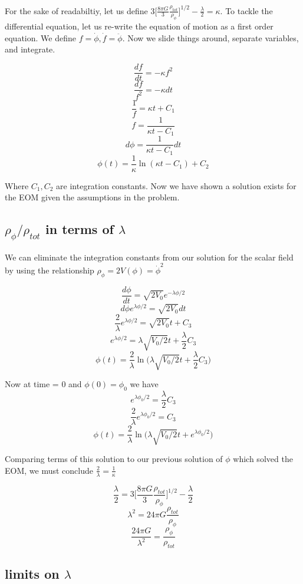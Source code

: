 \documentclass[12pt]{article}
\begin{document}
 For the sake of readabiltiy, let us define $3\Big[ \frac{8 \pi G}{3} \frac{\rho_{tot}}{ \rho_{\phi}} \Big]^{1/2} - \frac{\lambda}{2} = \kappa $. To tackle the differential equation, let us re-write the equation of motion as a first order equation. We define $f = \dot{\phi}, \dot{f} = \ddot{\phi}$. Now we slide things around, separate variables, and integrate. 
 
 $$\frac{d f}{d t} = -\kappa f^2 $$
 $$ \frac{df}{f^2} = -\kappa dt$$
 $$ \frac{1}{f} = \kappa t + C_1 $$
 $$ f = \frac{1}{\kappa t - C_1} $$
 $$ d\phi = \frac{1}{\kappa t - C_1} dt$$
 $$ \phi(t) = \frac{1}{\kappa} \ln(\kappa t - C_1) + C_2 $$
 
Where $C_1, C_2$ are integration constants. Now we have shown a solution exists for the EOM given the assumptions in the problem.

\subsection{$\rho_{\phi}/\rho_{tot}$ in terms of $\lambda$}

We can eliminate the integration constants from our solution for the scalar field by using the relationship $\rho_{\phi} = 2V(\phi) = \dot{\phi}^2$

$$ \frac{d\phi}{dt} = \sqrt{2V_0}e^{-\lambda \phi/2} $$
$$ d\phi e^{\lambda \phi/2}= \sqrt{2V_0} dt$$
$$  \frac{2}{\lambda} e^{\lambda \phi/2}= \sqrt{2V_0} t + C_3$$
$$ e^{\lambda \phi/2}= \lambda \sqrt{V_{0}/2} t + \frac{\lambda}{2}C_3$$
$$ \phi(t)= \frac{2}{\lambda} \ln  \Big(\lambda \sqrt{V_{0}/2} t + \frac{\lambda}{2}C_3 \Big)$$

Now at time = 0 and $\phi(0) = \phi_0$ we have
$$ e^{\lambda \phi_{0}/2} =  \frac{\lambda}{2}C_3$$
$$ \frac{2}{\lambda} e^{\lambda \phi_{0}/2} = C_3$$
$$ \phi(t)= \frac{2}{\lambda} \ln  \Big(\lambda \sqrt{V_{0}/2} t + e^{\lambda \phi_{0}/2} \Big)$$

Comparing terms of this solution to our previous solution of $\phi$ which solved the EOM, we must conclude $\frac{2}{\lambda} = \frac{1}{\kappa}$

$$ \frac{\lambda}{2}  = 3\Big[ \frac{8 \pi G}{3} \frac{\rho_{tot}}{ \rho_{\phi}} \Big]^{1/2} - \frac{\lambda}{2} $$
$$ \lambda^2 = 24 \pi G \frac{\rho_{tot}}{ \rho_{\phi}}$$
$$ \frac{24\pi G}{\lambda ^2}  = \frac{\rho_{\phi}}{ \rho_{tot}}$$

\subsection{limits on $\lambda$}
\end{document}
